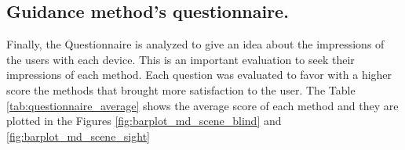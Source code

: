 \subsection{Guidance method's questionnaire.}
\label{subsec:results_questionnaires}

Finally, the Questionnaire is analyzed to give an idea about the impressions of the users with each device. This is an important evaluation to seek their impressions of each method. Each question was evaluated to favor with a higher score the methods that brought more satisfaction to the user. The Table \ref{tab:questionnaire_average} shows the average score of each method and they are plotted in the Figures \ref{fig:barplot_md_scene_blind} and \ref{fig:barplot_md_scene_sight}



